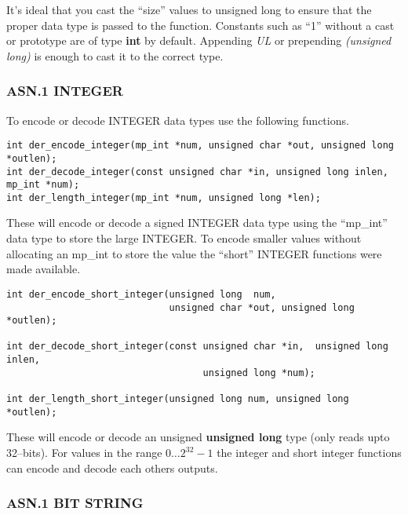 \documentclass[a4paper]{book}
\begin{document}
It's ideal that you cast the ``size'' values to unsigned long to ensure that the proper data type is passed to the function.  Constants such as ``1'' without
a cast or prototype are of type \textbf{int} by default.  Appending \textit{UL} or prepending \textit{(unsigned long)} is enough to cast it to the correct type.

\subsubsection{ASN.1 INTEGER}

To encode or decode INTEGER data types use the following functions.

\begin{verbatim}
int der_encode_integer(mp_int *num, unsigned char *out, unsigned long *outlen);
int der_decode_integer(const unsigned char *in, unsigned long inlen, mp_int *num);
int der_length_integer(mp_int *num, unsigned long *len);
\end{verbatim}

These will encode or decode a signed INTEGER data type using the ``mp\_int'' data type to store the large INTEGER.  To encode smaller values without allocating
an mp\_int to store the value the ``short'' INTEGER functions were made available.

\begin{verbatim}
int der_encode_short_integer(unsigned long  num, 
                             unsigned char *out, unsigned long *outlen);

int der_decode_short_integer(const unsigned char *in,  unsigned long inlen, 
                                   unsigned long *num);

int der_length_short_integer(unsigned long num, unsigned long *outlen);
\end{verbatim}

These will encode or decode an unsigned \textbf{unsigned long} type (only reads upto 32--bits).  For values in the range $0 \dots 2^{32} - 1$ the integer 
and short integer functions can encode and decode each others outputs.  

\subsubsection{ASN.1 BIT STRING}
\end{document}
